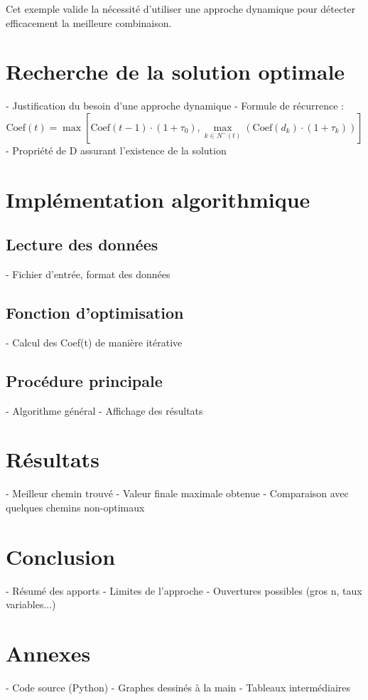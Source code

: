 \documentclass[a4paper,11pt]{article}
\begin{document}
    Cet exemple valide la nécessité d’utiliser une approche dynamique pour détecter efficacement la meilleure combinaison.



    \section{Recherche de la solution optimale}
    - Justification du besoin d’une approche dynamique
    - Formule de récurrence :
    \[
    \text{Coef}(t) = \max \left[ \text{Coef}(t-1) \cdot (1 + \tau_0), \max_{k \in N^{-}(t)} \left( \text{Coef}(d_k) \cdot (1 + \tau_k) \right) \right]
    \]
    - Propriété de D assurant l’existence de la solution

    \section{Implémentation algorithmique}
    \subsection{Lecture des données}
    - Fichier d’entrée, format des données

    \subsection{Fonction d’optimisation}
    - Calcul des Coef(t) de manière itérative

    \subsection{Procédure principale}
    - Algorithme général
    - Affichage des résultats

    \section{Résultats}
    - Meilleur chemin trouvé
    - Valeur finale maximale obtenue
    - Comparaison avec quelques chemins non-optimaux

    \section{Conclusion}
    - Résumé des apports
    - Limites de l’approche
    - Ouvertures possibles (gros n, taux variables...)
    
    \section*{Annexes}
    - Code source (Python)
    - Graphes dessinés à la main
    - Tableaux intermédiaires
\end{document}
